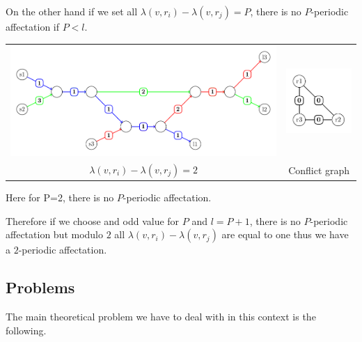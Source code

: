 \documentclass[a4paper,10pt]{article}
\begin{document}
\begin{center}
{{      On the other hand if we set all $\lambda(v,r_i) - \lambda(v,r_j)=P$, there is no $P$-periodic affectation if $P<l$.

      \begin{tabular}{cc}
      \includegraphics[scale=0.5]{Fig6.pdf} & \includegraphics[scale=1]{Fig8.pdf}\\
      $\lambda(v,r_i) - \lambda(v,r_j)=2$ & Conflict graph\\
      \end{tabular}\newline
      \begin{center}
      Here for P=2, there is no $P$-periodic affectation.
      \end{center}

      Therefore if we choose and odd value for $P$ and $l=P+1$, there is no $P$-periodic affectation but modulo $2$ all $\lambda(v,r_i) - \lambda(v,r_j)$
      are equal to one thus we have a $2$-periodic affectation. 
      }}

      \end{center}
   \subsection{Problems}

      The main theoretical problem we have to deal with in this context is the following.\\

\end{document}
